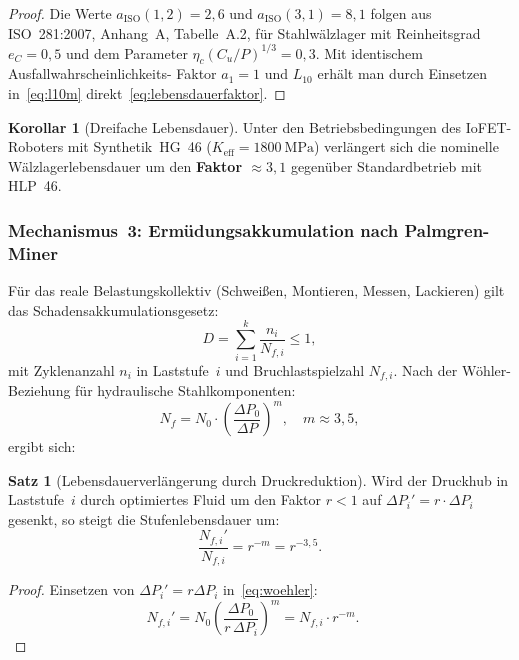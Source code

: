 ﻿\documentclass[a4paper,12pt]{scrreprt}
\theoremstyle{definition}
\newtheorem{satz}{Satz}[section]
\newtheorem{korollar}{Korollar}[section]
\begin{document}
\begin{proof}
Die Werte $a_{\text{ISO}}(1{,}2) = 2{,}6$ und $a_{\text{ISO}}(3{,}1) = 8{,}1$
folgen aus ISO~281:2007, Anhang~A, Tabelle~A.2, für Stahlwälzlager mit
Reinheitsgrad $e_C = 0{,}5$ und dem Parameter
$\eta_c (C_u/P)^{1/3} = 0{,}3$. Mit identischem Ausfallwahrscheinlichkeits-
Faktor $a_1 = 1$ und $L_{10}$ erhält man durch Einsetzen
in~\eqref{eq:l10m} direkt~\eqref{eq:lebensdauerfaktor}.
\end{proof}

\begin{korollar}[Dreifache Lebensdauer]
\label{kor:3x}
Unter den Betriebsbedingungen des IoFET-Roboters mit Synthetik~HG~46
($K_{\text{eff}} = \SI{1800}{\mega\pascal}$)
verlängert sich die nominelle Wälzlagerlebensdauer um
den \textbf{Faktor $\approx 3{,}1$} gegenüber Standardbetrieb mit HLP~46.
\end{korollar}

\subsubsection{Mechanismus~3: Ermüdungsakkumulation nach Palmgren-Miner}

Für das reale Belastungskollektiv (Schweißen, Montieren, Messen, Lackieren)
gilt das Schadensakkumulationsgesetz:
\begin{equation}
  D = \sum_{i=1}^{k} \frac{n_i}{N_{f,i}} \leq 1,
  \label{eq:miner}
\end{equation}
mit Zyklenanzahl $n_i$ in Laststufe~$i$ und Bruchlastspielzahl $N_{f,i}$.
Nach der Wöhler-Beziehung für hydraulische Stahlkomponenten:
\begin{equation}
  N_f = N_0 \cdot \left(\frac{\Delta P_0}{\Delta P}\right)^{m},
  \quad m \approx 3{,}5,
  \label{eq:woehler}
\end{equation}
ergibt sich:

\begin{satz}[Lebensdauerverlängerung durch Druckreduktion]
\label{satz:druckleben}
Wird der Druckhub in Laststufe~$i$ durch optimiertes Fluid um den
Faktor $r < 1$ auf $\Delta P_i' = r \cdot \Delta P_i$ gesenkt,
so steigt die Stufenlebensdauer um:
\begin{equation}
  \frac{N_{f,i}'}{N_{f,i}} = r^{-m} = r^{-3{,}5}.
  \label{eq:lebensteigerung}
\end{equation}
\end{satz}

\begin{proof}
Einsetzen von $\Delta P_i' = r \Delta P_i$ in~\eqref{eq:woehler}:
\begin{equation*}
N_{f,i}' = N_0 \left(\frac{\Delta P_0}{r\,\Delta P_i}\right)^m
         = N_{f,i} \cdot r^{-m}.\quad
\end{equation*}
\end{proof}
\end{document}
